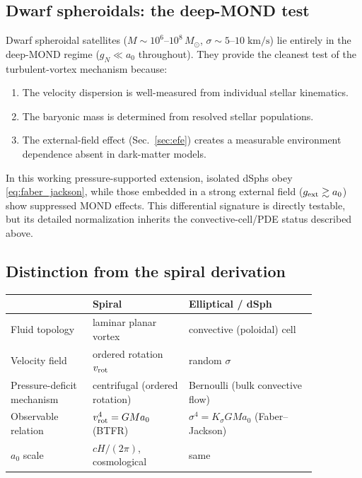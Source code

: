 \documentclass[11pt]{article}
\begin{document}
\subsection{Dwarf spheroidals: the deep-MOND test}

Dwarf spheroidal satellites ($M \sim 10^6$--$10^8\,M_\odot$,
$\sigma \sim 5$--$10\;\mathrm{km/s}$) lie entirely in the
deep-MOND regime ($g_N \ll a_0$ throughout).  They provide the
cleanest test of the turbulent-vortex mechanism because:
\begin{enumerate}
  \item The velocity dispersion is well-measured from individual
    stellar kinematics.
  \item The baryonic mass is determined from resolved stellar
    populations.
  \item The external-field effect (Sec.~\ref{sec:efe}) creates a
    measurable environment dependence absent in dark-matter models.
\end{enumerate}
In this working pressure-supported extension, isolated dSphs obey
\eqref{eq:faber_jackson}, while those embedded in a strong external
field ($g_{\rm ext} \gtrsim a_0$) show suppressed MOND effects.
This differential signature is directly testable, but its detailed
normalization inherits the convective-cell/PDE status described above.

\subsection{Distinction from the spiral derivation}

\begin{center}
\small
\begin{tabular}{@{}>{\raggedright\arraybackslash}p{0.23\linewidth}%
                >{\raggedright\arraybackslash}p{0.27\linewidth}%
                >{\raggedright\arraybackslash}p{0.36\linewidth}@{}}
\toprule
  & \textbf{Spiral} & \textbf{Elliptical / dSph} \\
\midrule
Fluid topology & laminar planar vortex & convective (poloidal) cell \\
Velocity field & ordered rotation $v_{\rm rot}$ & random $\sigma$ \\
Pressure-deficit mechanism & centrifugal (ordered rotation) & Bernoulli (bulk convective flow) \\
Observable relation & $v_{\rm rot}^4 = GM a_0$ (BTFR) & $\sigma^4 = K_\sigma GM a_0$ (Faber--Jackson) \\
$a_0$ scale & $cH/(2\pi)$, cosmological & same \\
\bottomrule
\end{tabular}
\end{center}
\end{document}

